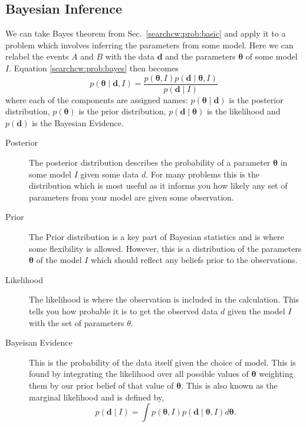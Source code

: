 \subsection{\label{searchcw:bayes}Bayesian Inference}

We can take Bayes theorem from Sec.~\ref{searchcw:prob:basic} and apply it to a
problem which involves inferring the parameters from some model. Here we can
relabel the events $A$ and $B$ with the data ${\bm d}$ and the parameters ${\bm
\theta}$ of some model $I$.  Equation \ref{searchcw:prob:bayes} then becomes
%
\begin{equation}
\label{searchcw:bayes:bayes}
p({\bm \theta} \mid {\bm d}, I) = \frac{p({\bm \theta}, I)p({\bm d} \mid {\bm \theta}, I)}{p({\bm d} \mid I)}
\end{equation}
%
where each of the components are assigned names: $p({\bm \theta} \mid {\bm d})$
is the posterior distribution, $p({\bm \theta})$ is the prior distribution,
$p({\bm d} \mid {\bm \theta})$ is the likelihood and $p({\bm d})$ is the
Bayesian Evidence.

\begin{description}
	\item [Posterior]
        The posterior distribution describes the probability of a parameter
${\bm \theta}$ in some model $I$ given some data $d$. For many problems this is
the distribution which is most useful as it informs you how likely any set of
parameters from your model are given some observation.
	
        \item [Prior] The Prior distribution is a key part of Bayesian
statistics and is where some flexibility is allowed. However, this is a distribution of the parameters ${\bm \theta}$ of the model $I$ which should reflect any beliefs prior to the observations.
	
        \item [Likelihood] The likelihood is where the observation is included
in the calculation. This tells you how probable it is to get the observed data
$d$ given the model $I$ with the set of parameters $\theta$. 
	
        \item [Bayeisan Evidence] This is the probability of the data itself
given the choice of model. This is found by integrating the likelihood over all
possible values of ${\bm \theta}$ weighting them by our prior belief of that
value of ${\bm \theta}$. This is also known as the marginal
likelihood and is defined by,
        \begin{equation} \label{search:bayes:evidence} 
            p({\bm d} \mid I) = \int p({\bm \theta}, I)p({\bm d} \mid {\bm \theta}, I) d{\bm \theta}.
        \end{equation} 
\end{description}

